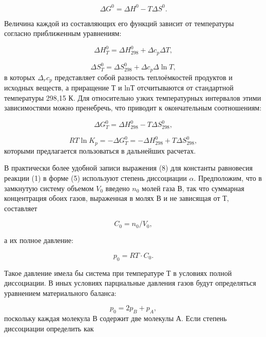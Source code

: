 \documentclass[a4paper,12pt]{article} %
\begin{document}
\begin{equation}
 \Delta G^0 = \Delta H^0 - T \Delta S^0.
\end{equation}

Величина каждой из составляющих его функций зависит от температуры согласно приближенным уравнениям:

\begin{equation}
 \Delta H_T^0 = \Delta H_{298}^0 + \Delta c_p \Delta T,
\end{equation}

\begin{equation}
 \Delta S_T^0 = \Delta S_{298}^0 + \Delta c_p \Delta \ln{T},
\end{equation}
в которых \(\Delta_rc_p\) представляет собой разность теплоёмкостей продуктов и исходных веществ, а приращение Т и lnТ отсчитываются от стандартной температуры 298,15 К. Для относительно узких температурных интервалов этими зависимостями можно пренебречь, что приводит к окончательным соотношениям:

\begin{equation}
 \Delta G_T^0 = \Delta H_{298}^0 - T \Delta S_{298}^0,
\end{equation}

\begin{equation}
 RT \ln K_p = - \Delta G_T^0 = -\Delta H_{298}^0 + T \Delta S_{298}^0,
\end{equation}
которыми предлагается пользоваться в дальнейших расчетах.
	
В практически более удобной записи выражения (8) для константы равновесия реакции (1) в форме (5) используют степень диссоциации \(\alpha\). Предположим, что в замкнутую систему объемом \(V_0\) введено \(n_0\) молей газа В, так что суммарная концентрация обоих газов, выраженная в молях В и не зависящая от Т, составляет

\begin{equation}
 C_0 = n_0 /V_0,
\end{equation}

а их полное давление:

\begin{equation}
 p_0 = RT \cdot C_0.
\end{equation}

Такое давление имела бы система при температуре Т в условиях полной диссоциации. В иных условиях парциальные давления газов будут определяться уравнением материального баланса:

\begin{equation}
 p_0 = 2p_B + p_A,
\end{equation}
поскольку каждая молекула В содержит две молекулы А.
Если степень диссоциации определить как
\end{document}
